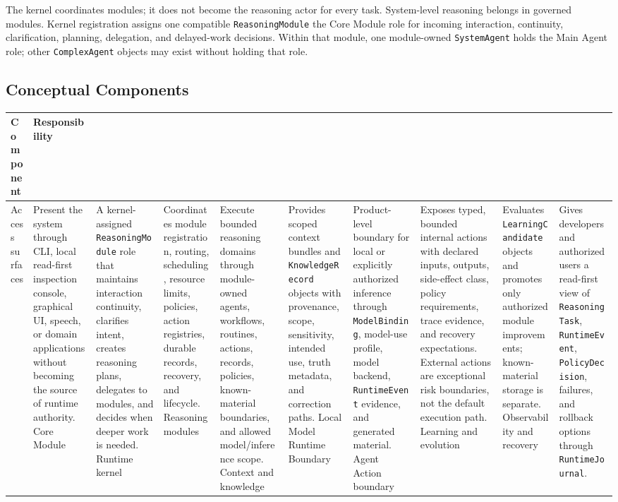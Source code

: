 \documentclass[11pt]{report}
\begin{document}
The kernel coordinates modules; it does not become the reasoning actor for every task. System-level reasoning belongs in governed modules. Kernel registration assigns one compatible \texttt{ReasoningModule} the Core Module role for incoming interaction, continuity, clarification, planning, delegation, and delayed-work decisions. Within that module, one module-owned \texttt{SystemAgent} holds the Main Agent role; other \texttt{ComplexAgent} objects may exist without holding that role.

\subsection{Conceptual Components}

\begin{tabularx}{.95\linewidth}{@{}lX@{}}
	\toprule
	\textbf{Component} & \textbf{Responsibility} \\
	\midrule
	Access surfaces & Present the system through CLI, local read-first inspection console, graphical UI, speech, or domain applications without becoming the source of runtime authority. \n
	Core Module & A kernel-assigned \texttt{ReasoningModule} role that maintains interaction continuity, clarifies intent, creates reasoning plans, delegates to modules, and decides when deeper work is needed. \n
	Runtime kernel & Coordinates module registration, routing, scheduling, resource limits, policies, action registries, durable records, recovery, and lifecycle. \n
	Reasoning modules & Execute bounded reasoning domains through module-owned agents, workflows, routines, actions, records, policies, known-material boundaries, and allowed model/inference scope. \n
	Context and knowledge & Provides scoped context bundles and \texttt{KnowledgeRecord} objects with provenance, scope, sensitivity, intended use, truth metadata, and correction paths. \n
	Local Model Runtime Boundary & Product-level boundary for local or explicitly authorized inference through \texttt{ModelBinding}, model-use profile, model backend, \texttt{RuntimeEvent} evidence, and generated material. \n
	Agent Action boundary & Exposes typed, bounded internal actions with declared inputs, outputs, side-effect class, policy requirements, trace evidence, and recovery expectations. External actions are exceptional risk boundaries, not the default execution path. \n
	Learning and evolution & Evaluates \texttt{LearningCandidate} objects and promotes only authorized module improvements; known-material storage is separate. \n
	Observability and recovery & Gives developers and authorized users a read-first view of \texttt{ReasoningTask}, \texttt{RuntimeEvent}, \texttt{PolicyDecision}, failures, and rollback options through \texttt{RuntimeJournal}. \\
	\bottomrule
\end{tabularx}
\end{document}
